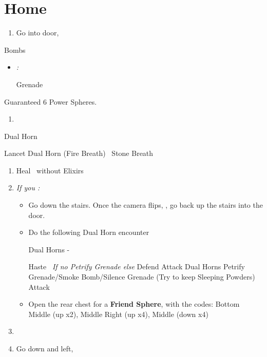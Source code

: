 \chapter{Home}

\begin{enumerate}
	\item Go into door, \sd
\end{enumerate}
\begin{battle}{Bombs}
	\begin{itemize}
		\tidusf Haste \tidus
		\tidusf Attach each, starting with Guado
		\auronf Attack Guado if it didn't die to \tidus
		\item \textit{\blitzloss:}
		      \begin{itemize}
			      \rikkuf Grenade
		      \end{itemize}
	\end{itemize}
	Guaranteed 6 Power Spheres.
\end{battle}
\begin{enumerate}[resume]
	\item \sd
\end{enumerate}
\begin{battle}{Dual Horn}
	\begin{itemize}
		\switch{anyone}{\kimahri}
		\kimahrif Lancet Dual Horn (Fire Breath)
		\kimahrif \od\ Stone Breath
	\end{itemize}
\end{battle}
\begin{enumerate}[resume]
	\item Heal \tidus\ without Elixirs
	\item \textit{If you \lostblitz:}
	      \begin{itemize}
		      \item Go down the stairs. Once the camera flips, \formation{\tidus}{\rikku}{\auron}, go back up the stairs into the door.
		      \item Do the following Dual Horn encounter
		            \begin{battle}{Dual Horns - \blitzloss}
			            \begin{itemize}
				            \tidusf Haste \tidus\ \textit{If no Petrify Grenade else } Defend
				            \tidusf Attack Dual Horns
				             Petrify Grenade/Smoke Bomb/Silence Grenade (Try to keep Sleeping Powders)
				            \tidusf Attack
			            \end{itemize}
		            \end{battle}
		      	\item Open the rear chest for a \textbf{Friend Sphere}, with the codes: Bottom Middle (up x2), Middle Right (up x4), Middle (down x4) %
	      \end{itemize}
	\item \formation{\tidus}{\lulu}{\auron}
	\item Go down and left, \cs[0:50]
\end{enumerate}
